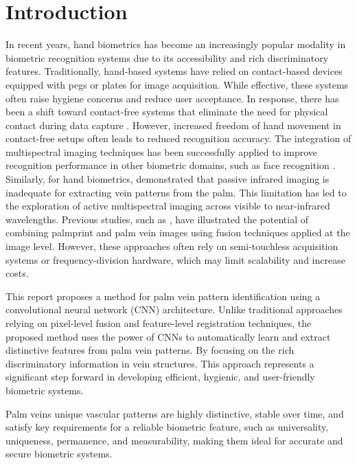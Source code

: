 \section{Introduction}

In recent years, hand biometrics has become an increasingly popular modality in biometric recognition systems due to its accessibility and rich discriminatory features. Traditionally, hand-based systems have relied on contact-based devices equipped with pegs or plates for image acquisition. While effective, these systems often raise hygiene concerns and reduce user acceptance. In response, there has been a shift toward contact-free systems that eliminate the need for physical contact during data capture \cite{xiong2005peg,jiang2007new,xiong2005model}. However, increased freedom of hand movement in contact-free setups often leads to reduced recognition accuracy. The integration of multispectral imaging techniques has been successfully applied to improve recognition performance in other biometric domains, such as face recognition \cite{kong2007multiscale, singh2008integrated}. Similarly, for hand biometrics, \cite{wang2006near} demonstrated that passive infrared imaging is inadequate for extracting vein patterns from the palm. This limitation has led to the exploration of active multispectral imaging across visible to near-infrared wavelengths. Previous studies, such as \cite{wang2007fusion}, have illustrated the potential of combining palmprint and palm vein images using fusion techniques applied at the image level. However, these approaches often rely on semi-touchless acquisition systems or frequency-division hardware, which may limit scalability and increase costs. 

This report proposes a method for palm vein pattern identification using a convolutional neural network (CNN) architecture. Unlike traditional approaches relying on pixel-level fusion and feature-level registration techniques, the proposed method uses the power of CNNs to automatically learn and extract distinctive features from palm vein patterns. By focusing on the rich discriminatory information in vein structures. This approach represents a significant step forward in developing efficient, hygienic, and user-friendly biometric systems.

Palm veins unique vascular patterns are highly distinctive, stable over time, and satisfy key requirements for a reliable biometric feature, such as universality, uniqueness, permanence, and measurability, making them ideal for accurate and secure biometric systems.